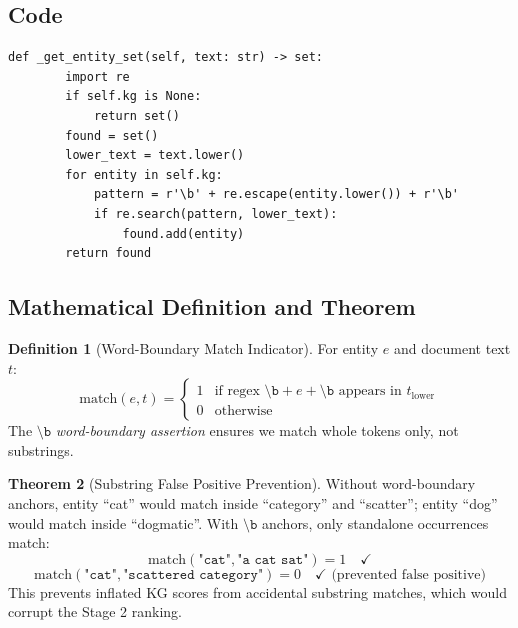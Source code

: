 \documentclass[12pt,a4paper]{article}
\theoremstyle{definition}
\newtheorem{theorem}{Theorem}[section]
\newtheorem{definition}[theorem]{Definition}
\theoremstyle{remark}
\begin{document}
\subsection{Code}

\begin{lstlisting}[caption={\texttt{NERKGReranker.\_get\_entity\_set()}}]
    def _get_entity_set(self, text: str) -> set:
        import re
        if self.kg is None:
            return set()
        found = set()
        lower_text = text.lower()
        for entity in self.kg:
            pattern = r'\b' + re.escape(entity.lower()) + r'\b'
            if re.search(pattern, lower_text):
                found.add(entity)
        return found
\end{lstlisting}

\subsection{Mathematical Definition and Theorem}

\begin{definition}[Word-Boundary Match Indicator]
For entity $e$ and document text $t$:
\[
  \text{match}(e, t)
  = \begin{cases}
    1 & \text{if regex } \texttt{\textbackslash b} + e + \texttt{\textbackslash b}
        \text{ appears in } t_{\text{lower}} \\
    0 & \text{otherwise}
  \end{cases}
\]
The $\texttt{\textbackslash b}$ \emph{word-boundary assertion} ensures we match
whole tokens only, not substrings.
\end{definition}

\begin{theorem}[Substring False Positive Prevention]
Without word-boundary anchors, entity ``cat'' would match inside
``category'' and ``scatter''; entity ``dog'' would match inside ``dogmatic''.
With $\texttt{\textbackslash b}$ anchors, only standalone occurrences match:
\[
  \text{match}(\texttt{"cat"}, \texttt{"a cat sat"}) = 1 \quad \checkmark
\]
\[
  \text{match}(\texttt{"cat"}, \texttt{"scattered category"}) = 0
  \quad \checkmark \text{ (prevented false positive)}
\]
This prevents inflated KG scores from accidental substring matches,
which would corrupt the Stage 2 ranking.
\end{theorem}
\end{document}
